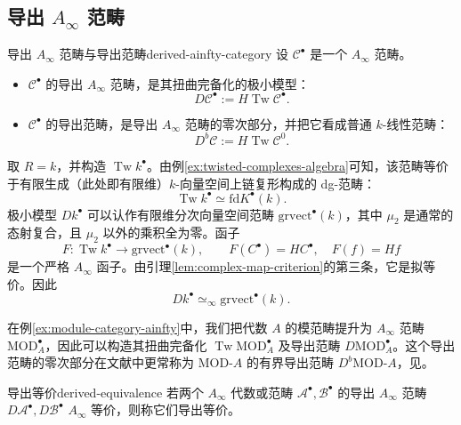 \subsection{导出 $A_\infty$ 范畴}\label{subsec:derived-ainfty-categories}
\begin{definition}{导出 $A_\infty$ 范畴与导出范畴}{derived-ainfty-category}
设 $\mathcal C^\bullet$ 是一个 $A_\infty$ 范畴。
\begin{itemize}
  \item $\mathcal C^\bullet$ 的导出 $A_\infty$ 范畴，是其扭曲完备化的极小模型：
  \[
    D\mathcal C^\bullet:=H\operatorname{Tw}\mathcal C^\bullet.
  \]
  \item $\mathcal C^\bullet$ 的导出范畴，是导出 $A_\infty$ 范畴的零次部分，并把它看成普通 $k$-线性范畴：
  \[
    D^b\mathcal C:=H\operatorname{Tw}\mathcal C^0.
  \]
\end{itemize}
\end{definition}

\begin{example}[向量空间复形的导出范畴]\label{ex:derived-vector-spaces}
取 $R=k$，并构造 $\operatorname{Tw}k^\bullet$。由例\ref{ex:twisted-complexes-algebra}可知，该范畴等价于有限生成（此处即有限维）$k$-向量空间上链复形构成的 dg-范畴：
\[
  \operatorname{Tw}k^\bullet\simeq \mathrm{fd}K^\bullet(k).
\]
极小模型 $Dk^\bullet$ 可以认作有限维分次向量空间范畴 $\mathrm{grvect}^\bullet(k)$，其中 $\mu_2$ 是通常的态射复合，且 $\mu_2$ 以外的乘积全为零。函子
\[
  F\colon\operatorname{Tw}k^\bullet\to\mathrm{grvect}^\bullet(k),
  \qquad
  F(C^\bullet)=HC^\bullet,\quad F(f)=Hf
\]
是一个严格 $A_\infty$ 函子。由引理\ref{lem:complex-map-criterion}的第三条，它是拟等价。因此
\[
  Dk^\bullet\simeq_\infty\mathrm{grvect}^\bullet(k).
\]
\end{example}

\begin{example}[模范畴的导出范畴]\label{ex:derived-module-category}
在例\ref{ex:module-category-ainfty}中，我们把代数 $A$ 的模范畴提升为 $A_\infty$ 范畴 $\mathrm{MOD}_A^\bullet$，因此可以构造其扭曲完备化 $\operatorname{Tw}\mathrm{MOD}_A^\bullet$ 及导出范畴 $D\mathrm{MOD}_A^\bullet$。这个导出范畴的零次部分在文献中更常称为 $\mathrm{MOD}\text{-}A$ 的有界导出范畴 $D^b\mathrm{MOD}\text{-}A$，见。
\end{example}

\begin{definition}{导出等价}{derived-equivalence}
若两个 $A_\infty$ 代数或范畴 $\mathcal A^\bullet,\mathcal B^\bullet$ 的导出 $A_\infty$ 范畴 $D\mathcal A^\bullet,D\mathcal B^\bullet$ $A_\infty$ 等价，则称它们导出等价。
\end{definition}

